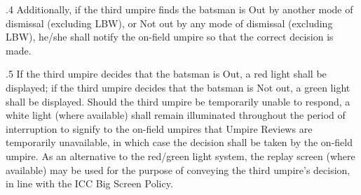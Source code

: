 \documentclass[12pt]{article}
\begin{document}
\vspace{\baselineskip}

\vspace{\baselineskip}

\vspace{\baselineskip}

\vspace{\baselineskip}

\vspace{\baselineskip}
\begin{adjustwidth}{0.0in}{0.08in}
\begin{Center}
{\fontsize{8pt}{9.6pt}\par}
\end{Center}\par

\end{adjustwidth}


\vspace{\baselineskip}

\vspace{\baselineskip}
\begin{adjustwidth}{0.5in}{0.03in}
{\fontsize{9pt}{10.8pt}.4 \tabto{0.49in} Additionally, if the third umpire finds the batsman is Out by another mode of dismissal (excluding LBW), or Not out by any mode of dismissal (excluding LBW), he/she shall notify the on-field umpire so that the correct decision is made.\par}\par

\end{adjustwidth}


\vspace{\baselineskip}
\begin{adjustwidth}{0.5in}{0.1in}
{\fontsize{9pt}{10.8pt}.5 \tabto{0.49in} If the third umpire decides that the batsman is Out, a red light shall be displayed; if the third umpire decides that the batsman is Not out, a green light shall be displayed. Should the third umpire be temporarily unable to respond, a white light (where available) shall remain illuminated throughout the period of interruption to signify to the on-field umpires that Umpire Reviews are temporarily unavailable, in which case the decision shall be taken by the on-field umpire. As an alternative to the red/green light system, the replay screen (where available) may be used for the purpose of conveying the third umpire’s decision, in line with the ICC Big Screen Policy.\par}\par

\end{adjustwidth}
\end{document}
